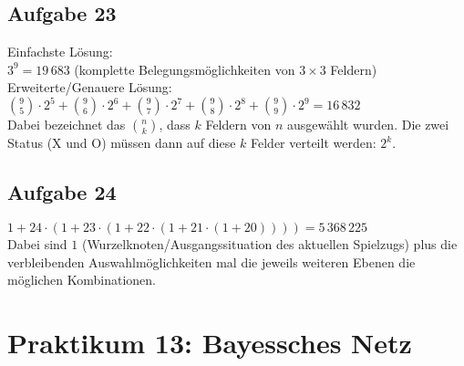\documentclass{scrreprt}
\begin{document}
\section{Aufgabe 23}
Einfachste Lösung: \\
$3^9=19\,683$ (komplette Belegungsmöglichkeiten von $3\times 3$ Feldern)\bigskip\\
Erweiterte/Genauere Lösung:\\
$\binom{9}{5}\cdot 2^5+
\binom{9}{6}\cdot 2^6+
\binom{9}{7}\cdot 2^7+
\binom{9}{8}\cdot 2^8+
\binom{9}{9}\cdot 2^9 = 16\,832$\\
Dabei bezeichnet das $\binom{n}{k}$, dass $k$ Feldern von $n$ ausgewählt wurden. Die zwei Status (X und O) müssen dann auf diese $k$ Felder verteilt werden: $2^k$.

\section{Aufgabe 24}
$1+24\cdot (1+23\cdot (1+22\cdot(1+21\cdot (1+20))))=5\,368\,225$\\
Dabei sind $1$ (Wurzelknoten/Ausgangssituation des aktuellen Spielzugs) plus die verbleibenden Auswahlmöglichkeiten mal die jeweils weiteren Ebenen die möglichen Kombinationen.

\chapter{Praktikum 13: Bayessches Netz}
\end{document}
